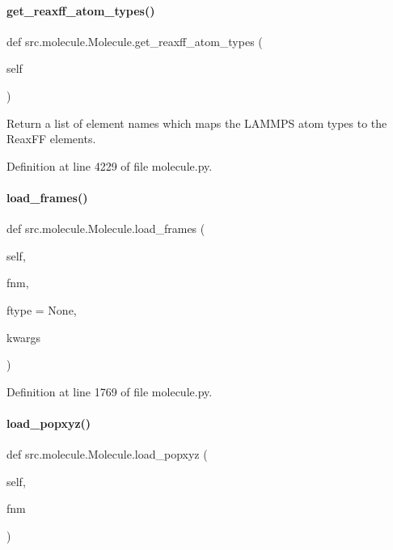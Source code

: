 \paragraph{\texorpdfstring{get\+\_\+reaxff\+\_\+atom\+\_\+types()}{get\_reaxff\_atom\_types()}}
{\footnotesize\ttfamily def src.\+molecule.\+Molecule.\+get\+\_\+reaxff\+\_\+atom\+\_\+types (\begin{DoxyParamCaption}\item[{}]{self }\end{DoxyParamCaption})}



Return a list of element names which maps the L\+A\+M\+M\+PS atom types to the Reax\+FF elements. 



Definition at line 4229 of file molecule.\+py.

\mbox{\label{classsrc_1_1molecule_1_1Molecule_a93e42cc0135d2a68354e384d6bc9185b}} 
\paragraph{\texorpdfstring{load\+\_\+frames()}{load\_frames()}}
{\footnotesize\ttfamily def src.\+molecule.\+Molecule.\+load\+\_\+frames (\begin{DoxyParamCaption}\item[{}]{self,  }\item[{}]{fnm,  }\item[{}]{ftype = {\ttfamily None},  }\item[{}]{kwargs }\end{DoxyParamCaption})}



Definition at line 1769 of file molecule.\+py.

\mbox{\label{classsrc_1_1molecule_1_1Molecule_af2cf7dad143a2cca4cfa651c82185c3d}} 
\paragraph{\texorpdfstring{load\+\_\+popxyz()}{load\_popxyz()}}
{\footnotesize\ttfamily def src.\+molecule.\+Molecule.\+load\+\_\+popxyz (\begin{DoxyParamCaption}\item[{}]{self,  }\item[{}]{fnm }\end{DoxyParamCaption})}



